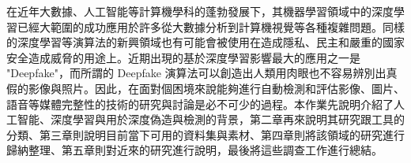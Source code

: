 \begin{cabstract}
在近年大數據、人工智能等計算機學科的蓬勃發展下，其機器學習領域中的深度學習已經大範圍的成功應用於許多從大數據分析到計算機視覺等各種複雜問題。同樣的深度學習等演算法的新興領域也有可能會被使用在造成隱私、民主和嚴重的國家安全造成威脅的用途上。近期出現的基於深度學習影響最大的應用之一是 "Deepfake"，而所謂的 Deepfake 演算法可以創造出人類用肉眼也不容易辨別出真假的影像與照片。因此，在面對個困境來說能夠進行自動檢測和評估影像、圖片、語音等媒體完整性的技術的研究與討論是必不可少的過程。本作業先說明介紹了人工智能、深度學習與用於深度偽造與檢測的背景，第二章再來說明其研究跟工具的分類、第三章則說明目前當下可用的資料集與素材、第四章則將該領域的研究進行歸納整理、第五章則對近來的研究進行說明，最後將這些調查工作進行總結。

\end{cabstract}


